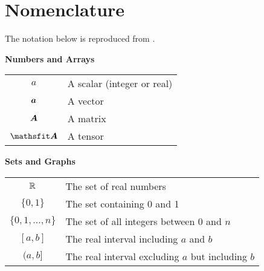 \chapter{Nomenclature}
The notation below is reproduced from \citet{Goodfellow-et-al-2016}.


\vspace{\notationgap}
\begin{minipage}{\textwidth}
	\centerline{\bf Numbers and Arrays}
	\bgroup
	\def\arraystretch{1.5}
	\begin{tabular}{cp{3.25in}}
		$\displaystyle a$ & A scalar (integer or real)\\
		$\displaystyle {\bm{a}}$ & A vector\\
		$\displaystyle {\bm{A}}$ & A matrix\\
		$\displaystyle \tA$ & A tensor\\
	\end{tabular}
	\egroup
\end{minipage}

\vspace{\notationgap}
\begin{minipage}{\textwidth}
	\centerline{\bf Sets and Graphs}
	\bgroup
	\def\arraystretch{1.5}
	\begin{tabular}{cp{3.25in}}
		$\displaystyle \mathbb{R}$ & The set of real numbers \\
		$\displaystyle \{0, 1\}$ & The set containing 0 and 1 \\
		$\displaystyle \{0, 1, \dots, n \}$ & The set of all integers between $0$ and $n$\\
		$\displaystyle [a, b]$ & The real interval including $a$ and $b$\\
		$\displaystyle (a, b]$ & The real interval excluding $a$ but including $b$\\
	\end{tabular}
	\egroup
\end{minipage}

